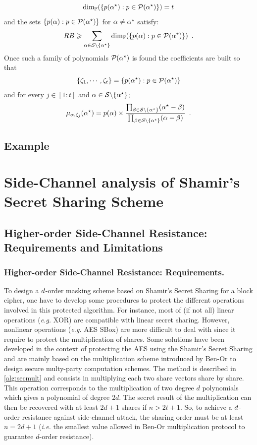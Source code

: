 \documentclass{llncs}
\begin{document}
$$
\dim_{\mathbb{F}} (\{p(\alpha^{\star}): p\in \mathcal{P}(\alpha^{\star})\}) = t
$$
and the sets $\{p(\alpha): p\in \mathcal{P}(\alpha^{\star})\}$ for $\alpha \neq \alpha^{\star}$ satisfy:
$$
RB \geqslant \sum_{\alpha \in \mathcal{S} \backslash \{\alpha^{\star}\}} \dim_{\mathbb{F}} (\{p(\alpha): p\in \mathcal{P}(\alpha^{\star})\}) \enspace .
$$
Once such a family of polynomials $\mathcal{P}(\alpha^{\star})$ is found the coefficients are built so that
$$
\{\zeta_1,\cdots,\zeta_t\} = \{p(\alpha^{\star}): p\in \mathcal{P}(\alpha^{\star})\}
$$
and for every $j\in [1:t]$ and $\alpha \in \mathcal{S} \backslash \{\alpha^{\star}\}$;
$$
\mu_{\alpha,\zeta_j}(\alpha^{\star}) = p(\alpha)\times \frac{\prod_{\beta\in \mathcal{S} \backslash \{\alpha^{\star}\}}(\alpha^{\star} - \beta)}{\prod_{\beta\in \mathcal{S} \backslash \{\alpha^{\star}\}}(\alpha - \beta)} \enspace .
$$

 
\subsection{Example}
 \todo{}

\section{Side-Channel analysis of Shamir's Secret Sharing Scheme}
\subsection{Higher-order Side-Channel Resistance: Requirements and Limitations}
\subsubsection{Higher-order Side-Channel Resistance: Requirements.} To design a $d$\myth-order masking scheme based on Shamir's Secret Sharing for a block cipher, one have to develop some procedures to protect the different operations involved in this protected algorithm. For instance, most of (if not all) linear operations (\emph{e.g.} XOR) are compatible with linear secret sharing. However, nonlinear operations (\emph{e.g.} AES SBox) are more difficult to deal with since it require to protect the multiplication of shares. Some solutions have been developed in the context of protecting the AES using the Shamir's Secret Sharing\cite{GM11,PR11,RP12} and are mainly based on the multiplication scheme introduced by
Ben-Or \etal to design secure multy-party computation schemes\cite{BGW88}.
The method is described in \ref{alg:secmult} and consists in multiplying each two share vectors share by share. This operation corresponds to the multiplication of two degree $d$ polynomials which gives a polynomial of degree $2d$. The secret result of the multiplication can then be recovered with at least $2d + 1$ shares if $n > 2t + 1$. 
So, to achieve a $d$\myth-order resistance against side-channel attack, the sharing order must be at least $n = 2d + 1$ (\emph{i.e.} the smallest value allowed in Ben-Or \etal multiplication protocol to guarantee $d$\myth-order resistance).
\end{document}
